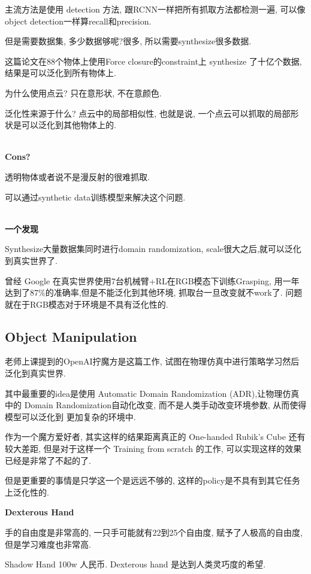 主流方法是使用 detection 方法, 跟RCNN一样把所有抓取方法都检测一遍, 
可以像object detection一样算recall和precision.

但是需要数据集, 多少数据够呢?很多, 所以需要synthesize很多数据.

这篇论文\cite{fang2020graspnet}在88个物体上使用Force closure的constraint上
synthesize 了十亿个数据,结果是可以泛化到所有物体上.

为什么使用点云? 只在意形状, 不在意颜色.

泛化性来源于什么? 点云中的局部相似性, 也就是说, 一个点云可以抓取的局部形状是可以泛化到其他物体上的.

\textbf{\\Cons?}

透明物体或者说不是漫反射的很难抓取.

可以通过synthetic data训练模型来解决这个问题.

\textbf{\\一个发现}

Synthesize大量数据集同时进行domain randomization, scale很大之后,就可以泛化到真实世界了.

曾经 Google 在真实世界使用7台机械臂+RL在RGB模态下训练Grasping, 
用一年达到了87\%的准确率,但是不能泛化到其他环境, 抓取台一旦改变就不work了.
问题就在于RGB模态对于环境是不具有泛化性的.

\subsection{Object Manipulation}

老师上课提到的OpenAI拧魔方是这篇工作\cite{openai2019solving}, 
试图在物理仿真中进行策略学习然后泛化到真实世界.

其中最重要的idea是使用 Automatic Domain Randomization (ADR),让物理仿真中的
Domain Randomization自动化改变, 而不是人类手动改变环境参数, 从而使得模型可以泛化到
更加复杂的环境中.

作为一个魔方爱好者, 其实这样的结果距离真正的 One-handed Rubik's Cube
还有较大差距, 但是对于这样一个 Training from scratch 的工作, 可以实现这样的效果已经是非常了不起的了.

但是更重要的事情是只学这一个是远远不够的, 这样的policy是不具有到其它任务上泛化性的.

\textbf{Dexterous Hand}

手的自由度是非常高的, 一只手可能就有22到25个自由度, 赋予了人极高的自由度, 但是学习难度也非常高.

Shadow Hand 100w 人民币. Dexterous hand 是达到人类灵巧度的希望.

